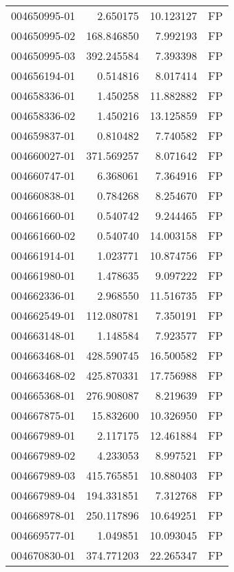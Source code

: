 \begin{tabular}{lrrl}
004650995-01 &    2.650175 &      10.123127 &   FP \\
004650995-02 &  168.846850 &       7.992193 &   FP \\
004650995-03 &  392.245584 &       7.393398 &   FP \\
004656194-01 &    0.514816 &       8.017414 &   FP \\
004658336-01 &    1.450258 &      11.882882 &   FP \\
004658336-02 &    1.450216 &      13.125859 &   FP \\
004659837-01 &    0.810482 &       7.740582 &   FP \\
004660027-01 &  371.569257 &       8.071642 &   FP \\
004660747-01 &    6.368061 &       7.364916 &   FP \\
004660838-01 &    0.784268 &       8.254670 &   FP \\
004661660-01 &    0.540742 &       9.244465 &   FP \\
004661660-02 &    0.540740 &      14.003158 &   FP \\
004661914-01 &    1.023771 &      10.874756 &   FP \\
004661980-01 &    1.478635 &       9.097222 &   FP \\
004662336-01 &    2.968550 &      11.516735 &   FP \\
004662549-01 &  112.080781 &       7.350191 &   FP \\
004663148-01 &    1.148584 &       7.923577 &   FP \\
004663468-01 &  428.590745 &      16.500582 &   FP \\
004663468-02 &  425.870331 &      17.756988 &   FP \\
004665368-01 &  276.908087 &       8.219639 &   FP \\
004667875-01 &   15.832600 &      10.326950 &   FP \\
004667989-01 &    2.117175 &      12.461884 &   FP \\
004667989-02 &    4.233053 &       8.997521 &   FP \\
004667989-03 &  415.765851 &      10.880403 &   FP \\
004667989-04 &  194.331851 &       7.312768 &   FP \\
004668978-01 &  250.117896 &      10.649251 &   FP \\
004669577-01 &    1.049851 &      10.093045 &   FP \\
004670830-01 &  374.771203 &      22.265347 &   FP \\

\end{tabular}
